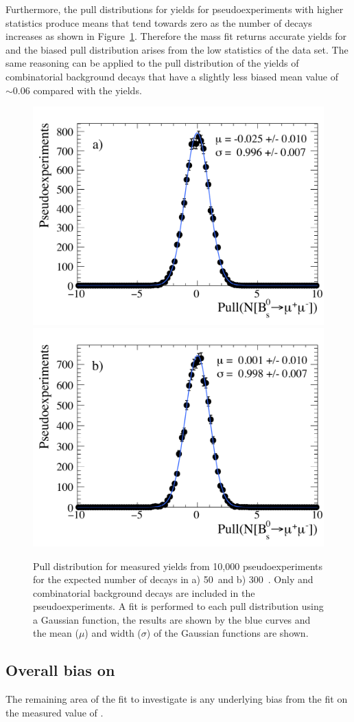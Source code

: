 Furthermore, the pull distributions for \bsmumu yields for pseudoexperiments with higher statistics produce means that tend towards zero as the number of decays increases as shown in Figure~\ref{fig:BsmumuYieldPulls1}. %
Therefore the mass fit returns accurate yields for \bsmumu and the biased pull distribution arises from the low statistics of the data set. The same reasoning can be applied to the pull distribution of the yields of combinatorial background decays that have a slightly less biased mean value of $\sim0.06$ compared with the \bsmumu yields.

\begin{figure}[tbp]
    \centering
        \includegraphics[width=0.49 \textwidth]{./Figs/LifetimeSystematics/Bs2MuMu_yield_pull_50fb.pdf}
        \includegraphics[width=0.49 \textwidth]{./Figs/LifetimeSystematics/Bs2MuMu_yield_pull_300fb.pdf}
    \caption{Pull distribution for \bsmumu measured yields from 10,000 pseudoexperiments for the expected number of decays in a) 50~\fb and b) 300~\fb. Only \bsmumu and combinatorial background decays are included in the pseudoexperiments. A fit is performed to each pull distribution using a Gaussian function, the results are shown by the blue curves and the mean ($\mu$) and width ($\sigma$) of the Gaussian functions are shown.}
    \label{fig:BsmumuYieldPulls1}
\end{figure}


\subsection[Overall bias on \tmumu]{Overall bias on \boldmath{\tmumu}}
The remaining area of the fit to investigate is any underlying bias from the fit on the measured value of \tmumu. %

